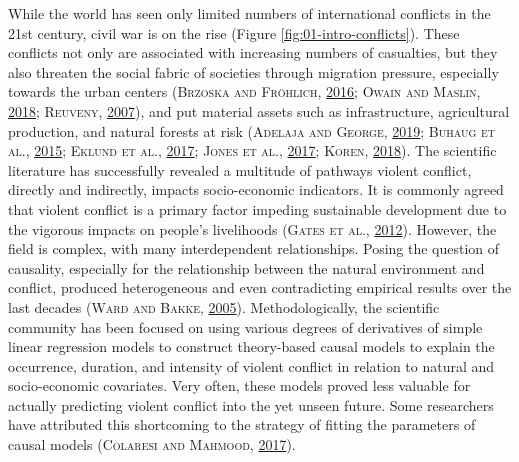 \documentclass[a4paper,11pt]{article}
\begin{document}
While the world has seen only limited numbers of international conflicts in the
21st century, civil war is on the rise (Figure \ref{fig:01-intro-conflicts}).
These conflicts not only are associated with increasing numbers of casualties,
but they also threaten the social fabric of societies through migration pressure,
especially towards the urban centers \textsc{(\textnormal{\textsc{Brzoska} and \textsc{Fröhlich}}, \textnormal{\protect\hyperlink{ref-brzoska2016}{2016}}; \textnormal{\textsc{Owain} and \textsc{Maslin}}, \textnormal{\protect\hyperlink{ref-owain2018}{2018}}; \textnormal{\textsc{Reuveny}}, \textnormal{\protect\hyperlink{ref-reuveny2007}{2007}})},
and put material assets such as infrastructure, agricultural production,
and natural forests at risk \textsc{(\textnormal{\textsc{Adelaja} and \textsc{George}}, \textnormal{\protect\hyperlink{ref-adelaja2019}{2019}}; \textnormal{\textsc{Buhaug} \textsc{et al.}}, \textnormal{\protect\hyperlink{ref-buhaug2015}{2015}}; \textnormal{\textsc{Eklund} \textsc{et al.}}, \textnormal{\protect\hyperlink{ref-eklund2017}{2017}}; \textnormal{\textsc{Jones} \textsc{et al.}}, \textnormal{\protect\hyperlink{ref-jones2017}{2017}}; \textnormal{\textsc{Koren}}, \textnormal{\protect\hyperlink{ref-koren2018}{2018}})}.
The scientific literature has successfully revealed a multitude of pathways
violent conflict, directly and indirectly, impacts socio-economic indicators.
It is commonly agreed that violent conflict is a primary factor impeding sustainable
development due to the vigorous impacts on people's livelihoods \textsc{(\textnormal{\textsc{Gates} \textsc{et al.}}, \textnormal{\protect\hyperlink{ref-gates2012}{2012}})}.
However, the field is complex, with many interdependent relationships. Posing the
question of causality, especially for the relationship between the natural environment
and conflict, produced heterogeneous and even contradicting empirical results over
the last decades \textsc{(\textnormal{\textsc{Ward} and \textsc{Bakke}}, \textnormal{\protect\hyperlink{ref-ward2005a}{2005}})}. Methodologically, the scientific community has
been focused on using various degrees of derivatives of simple linear regression
models to construct theory-based causal models to explain the occurrence, duration,
and intensity of violent conflict in relation to natural and socio-economic covariates.
Very often, these models proved less valuable for actually predicting violent
conflict into the yet unseen future. Some researchers have attributed this
shortcoming to the strategy of fitting the parameters of causal models \textsc{(\textnormal{\textsc{Colaresi} and \textsc{Mahmood}}, \textnormal{\protect\hyperlink{ref-colaresi2017}{2017}})}.
\end{document}
